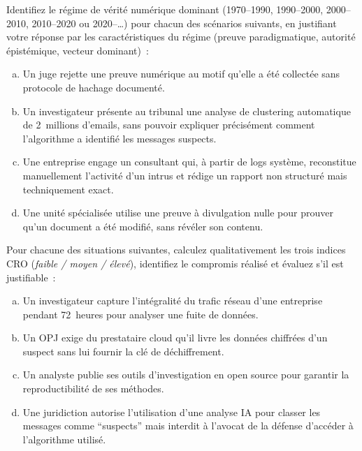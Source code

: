 \bigskip

\begin{boxexo}[title={\ding{45}\quad Exercice~1.1. Diagnostic de régime \niveaubase}]
Identifiez le régime de vérité numérique dominant (1970--1990,
1990--2000, 2000--2010, 2010--2020 ou 2020--\ldots) pour chacun des
scénarios suivants, en justifiant votre réponse par les caractéristiques
du régime (preuve paradigmatique, autorité épistémique, vecteur dominant)~:

\begin{enumerate}[(a)]
    \item Un juge rejette une preuve numérique au motif qu'elle a été
          collectée sans protocole de hachage documenté.
    \item Un investigateur présente au tribunal une analyse de clustering
          automatique de 2~millions d'emails, sans pouvoir expliquer
          précisément comment l'algorithme a identifié les messages suspects.
    \item Une entreprise engage un consultant qui, à partir de logs système,
          reconstitue manuellement l'activité d'un intrus et rédige
          un rapport non structuré mais techniquement exact.
    \item Une unité spécialisée utilise une preuve à divulgation nulle
          pour prouver qu'un document a été modifié, sans révéler son contenu.
\end{enumerate}
\end{boxexo}

\begin{boxexo}[title={\ding{45}\quad Exercice~1.2. Application du Trilemme CRO \niveaumoyen}]
Pour chacune des situations suivantes, calculez qualitativement les trois
indices CRO (\textit{faible / moyen / élevé}), identifiez le compromis
réalisé et évaluez s'il est justifiable~:

\begin{enumerate}[(a)]
    \item Un investigateur capture l'intégralité du trafic réseau d'une
          entreprise pendant 72~heures pour analyser une fuite de données.
    \item Un OPJ exige du prestataire cloud qu'il livre les données chiffrées
          d'un suspect sans lui fournir la clé de déchiffrement.
    \item Un analyste publie ses outils d'investigation en open source pour
          garantir la reproductibilité de ses méthodes.
    \item Une juridiction autorise l'utilisation d'une analyse IA pour
          classer les messages comme ``suspects'' mais interdit à l'avocat
          de la défense d'accéder à l'algorithme utilisé.
\end{enumerate}
\end{boxexo}


